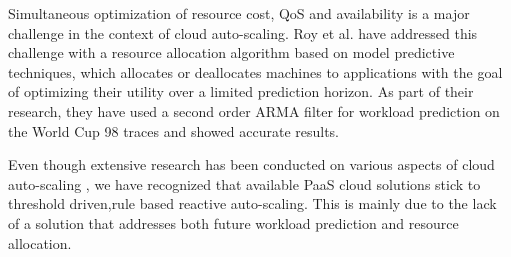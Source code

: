 Simultaneous optimization of resource cost, QoS and availability is a major challenge in the context of cloud auto-scaling. Roy et al. \cite{Roy_2011} have addressed this challenge with a resource allocation algorithm based on model predictive techniques, which allocates or deallocates machines to applications with the goal of optimizing their utility over a limited prediction horizon. As part of their research, they have used a second order ARMA filter for workload prediction on the World Cup 98 traces \cite{WorldCup_1998} and showed accurate results.

Even though extensive research has been conducted on various aspects of cloud auto-scaling \cite{Islam_2012} \cite{Zhenhuan_Gong_2010} \cite{Moore_2013} \cite{reviewofautoscaling}, we have recognized that available PaaS cloud solutions stick to threshold driven,rule based reactive auto-scaling. This is mainly due to the lack of a solution that addresses both future workload prediction and resource allocation.